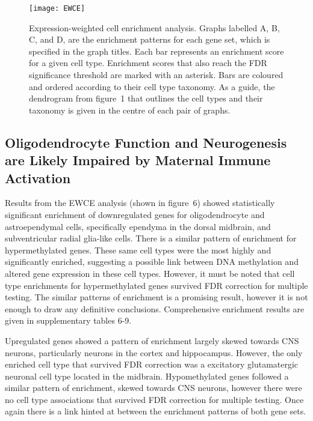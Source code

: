 \documentclass{bioinfo}
\begin{document}
\begin{results}
\begin{figure*}[!h]
\centerline{\texttt{[image: EWCE]}}
\caption{Expression-weighted cell enrichment analysis. Graphs labelled A, B, C, and D, are the enrichment patterns for each gene set, which is specified in the graph titles. Each bar represents an enrichment score for a given cell type. Enrichment scores that also reach the FDR significance threshold are marked with an asterisk. Bars are coloured and ordered according to their cell type taxonomy. As a guide, the dendrogram from  figure~1\vphantom{\ref{fig:01}} that outlines the cell types and their taxonomy is given in the centre of each pair of graphs.}\label{fig:06}
\end{figure*}


\subsection{Oligodendrocyte Function and Neurogenesis are Likely Impaired by Maternal Immune Activation}
Results from the EWCE analysis (shown in figure~6\vphantom{\ref{fig:06}}) showed statistically significant enrichment of downregulated genes for oligodendrocyte and astroependymal cells, specifically ependyma in the dorsal midbrain, and subventricular radial glia-like cells. There is a similar pattern of enrichment for hypermethylated genes. These same cell types were the most highly and significantly enriched, suggesting a possible link between DNA methylation and altered gene expression in these cell types. However, it must be noted that cell type enrichments for hypermethylated genes survived FDR correction for multiple testing. The similar patterns of enrichment is a promising result, however it is not enough to draw any definitive conclusions. Comprehensive enrichment results are given in supplementary tables 6-9.

Upregulated genes showed a pattern of enrichment largely skewed towards CNS neurons, particularly neurons in the cortex and hippocampus. However, the only enriched cell type that survived FDR correction was a excitatory glutamatergic neuronal cell type located in the midbrain. Hypomethylated genes followed a similar pattern of enrichment, skewed towards CNS neurons, however there were no cell type associations that survived FDR correction for multiple testing. Once again there is a link hinted at between the enrichment patterns of both gene sets.

\end{results}
\end{document}
